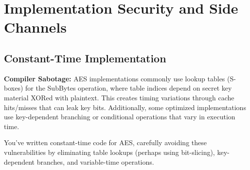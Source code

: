\documentclass[10pt,a4paper,american]{exam}
\begin{document}
\section{Implementation Security and Side Channels}
\begin{questions}
	\subsection*{Constant-Time Implementation}

	\question[5] \textbf{Compiler Sabotage:}
	AES implementations commonly use lookup tables (S-boxes) for the SubBytes operation, where table indices depend on secret key material XORed with plaintext. This creates timing variations through cache hits/misses that can leak key bits. Additionally, some optimized implementations use key-dependent branching or conditional operations that vary in execution time.

	You've written constant-time code for AES, carefully avoiding these vulnerabilities by eliminating table lookups (perhaps using bit-slicing), key-dependent branches, and variable-time operations.


\end{questions}
\end{document}
